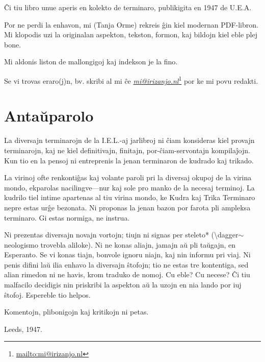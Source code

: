 \newpage

\newpage\vspace*{\fill}
\thispagestyle{empty}

Ĉi tiu libro unue aperis en kolekto de terminaro, publikigita en 1947 de U.E.A.

Por ne perdi la enhavon, mi (Tanja Orme) rekreis ĝin kiel modernan PDF-libron. Mi klopodis uzi la originalan aspekton, tekston, formon, kaj bildojn kiel eble plej bone.

Mi aldonis liston de mallongigoj kaj indekson je la fino.

Se vi trovas eraro(j)n, bv. skribi al mi ĉe \href{mailto:mi@irizanjo.nl}{\emph{mi@irizanjo.nl}}\footnote{\href{mailto:mi@irizanjo.nl}{mailto:mi@irizanjo.nl}} por ke mi povu redakti.

\newpage

\section[Antaŭparolo]{Antaŭparolo}
\hypertarget{Antaŭparolo}{}
\label{Antaŭparolo}


\thispagestyle{empty}

La diversajn terminarojn de la I.E.L.-aj jarlibroj ni ĉiam konsideras kiel provajn terminarojn, kaj ne kiel definitivajn, finitajn, por-ĉiam-servontajn kompilaĵojn. Kun tio en la pensoj ni entreprenis la jenan terminaron de kudrado kaj trikado.

La virinoj ofte renkontiĝas kaj volante paroli pri la diversaj okupoj de la virina mondo, ekparolas nacilingve---nur kaj sole pro manko de la necesaj terminoj. La kudrilo tiel intime apartenas al tiu virina mondo, ke Kudra kaj Trika Terminaro nepre estas urĝe bezonata. Ni proponas la jenan bazon por farota pli ampleksa terminaro. Gi estas normiga, ne instrua.

Ni prezentas diversajn novajn vortojn; tiujn ni signas per steleto* (\textbackslash{}dagger\ensuremath{\sim} neologismo trovebla aliloke). Ni ne konas aliajn, jamajn aŭ pli taŭgajn, en Esperanto. Se vi konas tiajn, bonvole ignoru niajn, kaj nin informu pri viaj. Ni penis difini laŭ ilia enhavo la diversajn ŝtofojn; tio ne estas tre kontentiga, sed alian rimedon ni ne havis, krom traduko de nomoj. Cu eble? Cu necese? Ĉi tiu malfacilo decidigis nin priskribi la aspekton aŭ la uzojn en nia lando por iuj ŝtofoj. Espereble tio helpos.

Komentojn, plibonigojn kaj kritikojn ni petas.

Leeds, 1947.


